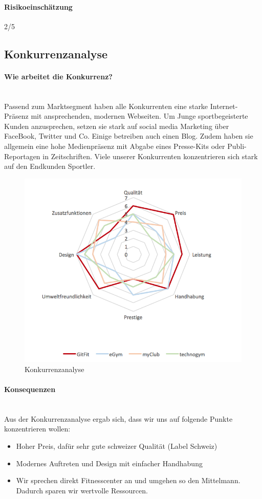 \paragraph{Risikoeinschätzung} \qquad {} 2/5
\subsection{Konkurrenzanalyse}
\paragraph{Wie arbeitet die Konkurrenz?} \hfill \\
Passend zum Marktsegment haben alle Konkurrenten eine starke Internet-Präsenz mit ansprechenden, modernen Webseiten. 
Um Junge sportbegeisterte Kunden anzusprechen, setzen sie stark auf social media Marketing über FaceBook, Twitter und Co. Einige betreiben auch einen Blog. Zudem haben sie allgemein eine hohe Medienpräsenz mit Abgabe eines Presse-Kits oder Publi-Reportagen in Zeitschriften. Viele unserer Konkurrenten konzentrieren sich stark auf den Endkunden Sportler.

\begin{figure}[H]
\centering
\includegraphics[width=0.9\linewidth]{images/konkurrenz}
\caption{Konkurrenzanalyse}
\label{fig:konkurrenz}
\end{figure}
\paragraph{Konsequenzen}\hfill \\
Aus der Konkurrenzanalyse ergab sich, dass wir uns auf folgende Punkte konzentrieren wollen:
\begin{itemize}
	\item Hoher Preis, dafür sehr gute schweizer Qualität (Label Schweiz)
	\item Modernes Auftreten und Design mit einfacher Handhabung
	\item Wir sprechen direkt Fitnesscenter an und umgehen so den Mittelmann. Dadurch sparen wir wertvolle Ressourcen.
\end{itemize}

